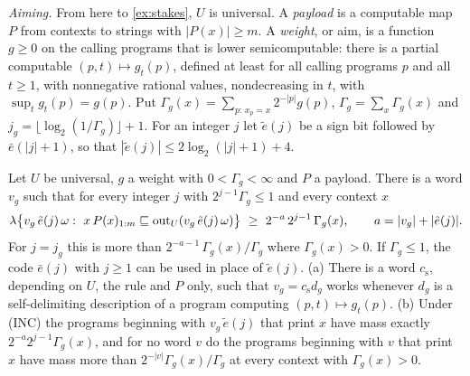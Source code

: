 \emph{Aiming.} From here to \cref{ex:stakes}, $U$ is universal. A \emph{payload} is a computable map $P$
from contexts to strings with $|P(x)|\ge m$. A \emph{weight}, or aim, is a function $g\ge0$ on the calling
programs that is lower semicomputable: there is a partial computable $(p,t)\mapsto g_t(p)$, defined at least
for all calling programs $p$ and all $t\ge1$, with nonnegative rational values, nondecreasing in $t$, with
$\sup_tg_t(p)=g(p)$. Put $\Gamma_g(x)=\sum_{p:\,x_p=x}2^{-|p|}g(p)$, $\Gamma_g=\sum_x\Gamma_g(x)$ and
$j_g=\lfloor\log_2(1/\Gamma_g)\rfloor+1$. For an integer $j$ let $\tilde e(j)$ be a sign bit followed by
$\bar e(|j|+1)$, so that $|\tilde e(j)|\le2\log_2(|j|+1)+4$.
\begin{theorem}\label{thm:weighted}
Let $U$ be universal, $g$ a weight with $0<\Gamma_g<\infty$ and $P$ a payload. There is a word $v_g$ such
that for every integer $j$ with $2^{j-1}\Gamma_g\le1$ and every context $x$
\[\lambda\bigl\{v_g\,\tilde e(j)\,\omega:\ x\,P(x)_{1:m}\pre\out_U(v_g\,\tilde e(j)\,\omega)\bigr\}\ \ge\
2^{-a}\,2^{j-1}\,\Gamma_g(x),\qquad a=|v_g|+|\tilde e(j)| .\]
For $j=j_g$ this is more than $2^{-a-1}\,\Gamma_g(x)/\Gamma_g$ where $\Gamma_g(x)>0$. If $\Gamma_g\le1$, the
code $\bar e(j)$ with $j\ge1$ can be used in place of $\tilde e(j)$. \textup{(a)} There is a word
$c_{\mathrm s}$, depending on $U$, the rule and $P$ only, such that $v_g=c_{\mathrm s}d_g$ works whenever
$d_g$ is a self-delimiting description of a program computing $(p,t)\mapsto g_t(p)$. \textup{(b)} Under
(INC) the programs beginning with $v_g\,\tilde e(j)$ that print $x$ have mass exactly
$2^{-a}2^{j-1}\Gamma_g(x)$, and for no word $v$ do the programs beginning with $v$ that print $x$ have mass
more than $2^{-|v|}\Gamma_g(x)/\Gamma_g$ at every context with $\Gamma_g(x)>0$.
\end{theorem}
